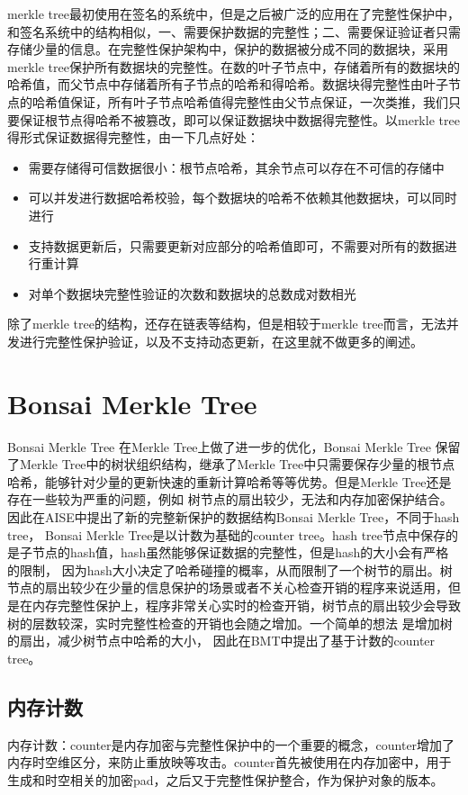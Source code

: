 merkle tree最初使用在签名的系统中，但是之后被广泛的应用在了完整性保护中，和签名系统中的结构相似，一、需要保护数据的完整性；二、需要保证验证者只需存储少量的信息。在完整性保护架构中，保护的数据被分成不同的数据块，采用merkle tree保护所有数据块的完整性。在数的叶子节点中，存储着所有的数据块的
哈希值，而父节点中存储着所有子节点的哈希和得哈希。数据块得完整性由叶子节点的哈希值保证，所有叶子节点哈希值得完整性由父节点保证，一次类推，我们只要保证根节点得哈希不被篡改，即可以保证数据块中数据得完整性。以merkle tree得形式保证数据得完整性，由一下几点好处：
\begin{itemize}
    \item 需要存储得可信数据很小：根节点哈希，其余节点可以存在不可信的存储中
    \item 可以并发进行数据哈希校验，每个数据块的哈希不依赖其他数据块，可以同时进行
    \item 支持数据更新后，只需要更新对应部分的哈希值即可，不需要对所有的数据进行重计算
    \item 对单个数据块完整性验证的次数和数据块的总数成对数相光
\end{itemize}
除了merkle tree的结构，还存在链表等结构，但是相较于merkle tree而言，无法并发进行完整性保护验证，以及不支持动态更新，在这里就不做更多的阐述。

\section{Bonsai Merkle Tree}
Bonsai Merkle Tree \cite{rogers2007using}在Merkle Tree上做了进一步的优化，Bonsai Merkle Tree 保留了Merkle Tree中的树状组织结构，继承了Merkle Tree中只需要保存少量的根节点哈希，能够针对少量的更新快速的重新计算哈希等等优势。但是Merkle Tree还是存在一些较为严重的问题，例如
树节点的扇出较少，无法和内存加密保护结合。因此在AISE中提出了新的完整新保护的数据结构Bonsai Merkle Tree，不同于hash tree， Bonsai Merkle Tree是以计数为基础的counter tree。hash tree节点中保存的是子节点的hash值，hash虽然能够保证数据的完整性，但是hash的大小会有严格的限制，
因为hash大小决定了哈希碰撞的概率，从而限制了一个树节的扇出。树节点的扇出较少在少量的信息保护的场景或者不关心检查开销的程序来说适用，但是在内存完整性保护上，程序非常关心实时的检查开销，树节点的扇出较少会导致树的层数较深，实时完整性检查的开销也会随之增加。一个简单的想法
是增加树的扇出，减少树节点中哈希的大小， 因此在BMT中提出了基于计数的counter tree。

\subsection{内存计数}
内存计数：counter是内存加密与完整性保护中的一个重要的概念，counter增加了内存时空维区分，来防止重放映等攻击。counter首先被使用在内存加密中，用于生成和时空相关的加密pad，之后又于完整性保护整合，作为保护对象的版本。

